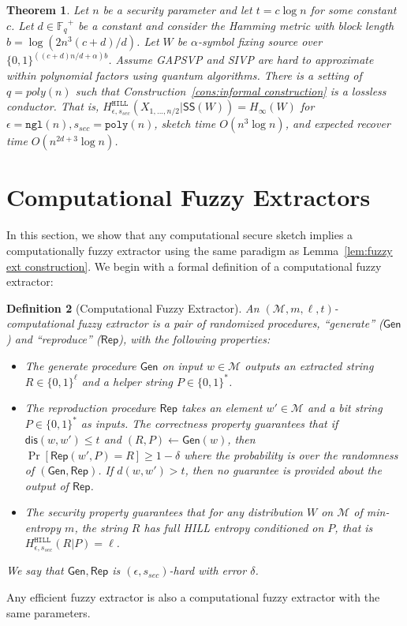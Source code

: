 \documentclass[11pt]{article}
\newcommand{\lemref}[1]{\mbox{Lemma~\ref{#1}}}
\newcommand{\consref}[1]{\mbox{Construction~\ref{#1}}}
\newcommand{\class}[1]{{\ensuremath{\mathsf{#1}}}}
\newcommand{\gen}{\ensuremath{\class{Gen}}\xspace}
\newcommand{\rep}{\ensuremath{\class{Rep}}\xspace}
\newcommand{\sketch}{\ensuremath{\class{SS}}\xspace}
\newcommand{\rec}{\ensuremath{\class{Rec}}\xspace}
\newcommand{\zo}{\ensuremath{\{0, 1\}}}
\newcommand{\Fq}{\ensuremath{\mathbb{F}_q}}
\newcommand{\dis}{\ensuremath{\mathsf{dis}}}
\newcommand{\hill}{\ensuremath{\mathtt{HILL}}\xspace}
\newcommand{\poly}{\ensuremath{\mathtt{poly}}\xspace}
\newcommand{\ngl}{\ensuremath{\mathtt{ngl}}\xspace}
\newcommand{\Hoo}{\mathrm{H}_\infty}
\newtheorem{theorem}{Theorem}[section]
\newtheorem{definition}[theorem]{Definition}
\begin{document}
\begin{theorem}
\label{thm:lossless block sketch log}
Let $n$ be a security parameter and let $t = c\log n$ for some constant $c$.  Let $d\in\Fq^+$ be a constant and consider the Hamming metric with block length $b = \log (2n^3 (c+d)/d)$.  Let $W$ be $\alpha$-symbol fixing source over $\zo^{((c+d)n/d+\alpha)b}$.  Assume GAPSVP and SIVP are hard to approximate within polynomial factors using quantum algorithms.   There is a setting of $q = poly(n)$ such that \consref{cons:informal construction} is a lossless conductor.  That is, $H^{\hill}_{\epsilon, s_{sec}}(X_{1,..., n/2} |\sketch(W)) = H_\infty(W)$ for %
$\epsilon = \ngl(n), s_{sec} = \poly(n)$, sketch time $O(n^3\log n)$, and expected recover time $O(n^{2d+3} \log n)$.
\end{theorem}



\section{Computational Fuzzy Extractors}
In this section, we show that any computational secure sketch implies a computationally fuzzy extractor using the same paradigm as \lemref{lem:fuzzy ext construction}.  We begin with a formal definition of a computational fuzzy extractor:
\label{sec:comp fuzzy extractors}
\begin{definition}[Computational Fuzzy Extractor]\label{def:comp fuzzy extractor}
An $(\mathcal{M}, m, \ell, t)$-\emph{computational fuzzy extractor} is a pair of randomized procedures, ``generate'' (\gen) and ``reproduce'' (\rep), with the following properties:
\begin{itemize}
\item The generate procedure \gen on input $w\in \mathcal{M}$ outputs an extracted string $R\in\{0,1\}^\ell$ and a helper string $P\in\{0,1\}^*$.
\item The reproduction procedure \rep takes an element $w'\in\mathcal{M}$ and a bit string $P\in\{0,1\}^*$ as inputs.  The \emph{correctness} property guarantees that if $\dis(w, w')\leq t$ and $(R, P)\leftarrow \gen(w)$, then $\Pr[\rep( w', P) = R] \geq 1-\delta$ where the probability is over the randomness of $(\gen, \rep)$.  %
If $d(w, w') > t$, then no guarantee is provided about the output of \rep.
\item The \emph{security} property guarantees that for any distribution $W$ on $\mathcal{M}$ of min-entropy $m$, the string $R$ has full HILL entropy conditioned on $P$, that is $H^\hill_{\epsilon, s_{sec}}(R | P) = \ell$.
\end{itemize}
We say that $\gen, \rep$ is $(\epsilon, s_{sec})$-hard with error $\delta$.
\end{definition}
Any efficient fuzzy extractor is also a computational fuzzy extractor with the same parameters.%
\end{document}
